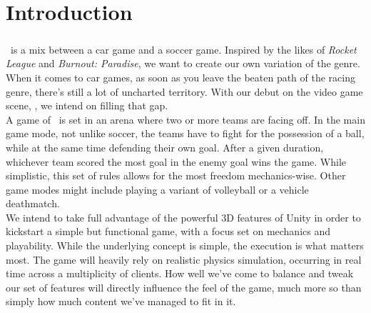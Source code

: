 


\pagestyle{empty} %

\titleGM %

\clearpage

\renewcommand*\contentsname{Table of contents}
\tableofcontents 

\chapter{Introduction}

\paragraph{}\FR~is a mix between a car game and a soccer game. Inspired by the likes of \emph{Rocket League} and \emph{Burnout: Paradise}, we want to create our own variation of the genre. When it comes to car games, as soon as you leave the beaten path of the racing genre, there’s still a lot of uncharted territory. With our debut on the video game scene, \FR, we intend on filling that gap.\\


A game of \FR~is set in an arena where two or more teams are facing off. In the main game mode, not unlike soccer, the teams have to fight for the possession of a ball, while at the same time defending their own goal. After a given duration, whichever team scored the most goal in the enemy goal wins the game. While simplistic, this set of rules allows for the most freedom mechanics-wise. Other game modes might include playing a variant of volleyball or a vehicle deathmatch.\\


We intend to take full advantage of the powerful 3D features of Unity in order to kickstart a simple but functional game, with a focus set on mechanics and playability. While the underlying concept is simple, the execution is what matters most. The game will heavily rely on realistic physics simulation, occurring in real time across a multiplicity of clients. How well we've come to balance and tweak our set of features will directly influence the feel of the game, much more so than simply how much content we've managed to fit in it.\\


